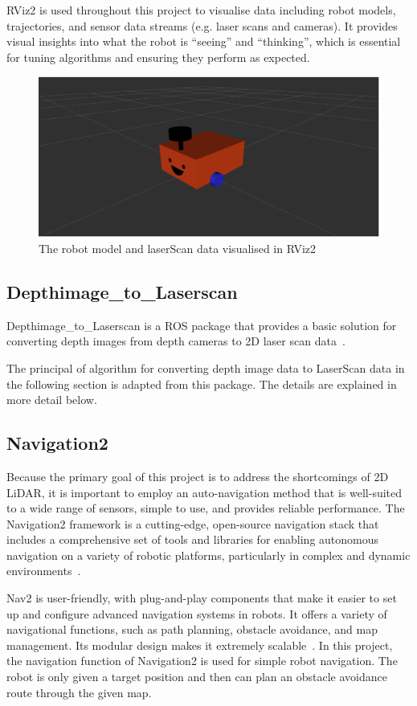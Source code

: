 RViz2 is used throughout this project to visualise data including robot models, 
trajectories, and sensor data streams (e.g. laser scans and cameras). 
It provides visual insights into what the robot is ``seeing'' and ``thinking'', 
which is essential for tuning algorithms and ensuring they perform as expected.
\begin{figure}[H]
    \centering
    \includegraphics[width=0.8\linewidth]{figs/robot.png}
    \caption{The robot model and laserScan data visualised in RViz2}
\end{figure}
\subsection{Depthimage\_to\_Laserscan}
Depthimage\_to\_Laserscan is a ROS package that provides a basic solution for converting depth images from depth cameras to 2D laser scan data~\cite{rosdepthimage}. 

The principal of algorithm for converting depth image data to LaserScan data in the following section is adapted from this package. 
The details are explained in more detail below.

\subsection{Navigation2}
Because the primary goal of this project is to address the shortcomings of 2D LiDAR, 
it is important to employ an auto-navigation method that is well-suited to a wide range of sensors, 
simple to use, and provides reliable performance.
The Navigation2 framework is a cutting-edge, 
open-source navigation stack that includes a comprehensive set of tools and libraries 
for enabling autonomous navigation on a variety of robotic platforms, particularly in complex and dynamic environments~\cite{nav2}. 

Nav2 is user-friendly, with plug-and-play components 
that make it easier to set up and configure advanced navigation systems in robots. 
It offers a variety of navigational functions, 
such as path planning, obstacle avoidance, and map management. Its modular design makes it extremely scalable~\cite{nav2doc}. 
In this project, the navigation function of Navigation2 is used for simple robot navigation. 
The robot is only given a target position and then can plan an obstacle avoidance route through the given map.
